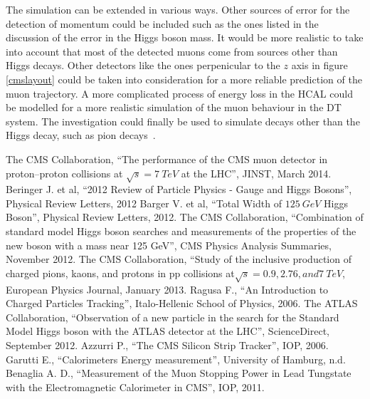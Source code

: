 \documentclass{article}
\begin{document}
The simulation can be extended in various ways. Other sources of error for the detection of momentum could be included such as the ones listed in the discussion of the error in the Higgs boson mass. It would be more realistic to take into account that most of the detected muons come from sources other than Higgs decays. Other detectors like the ones perpenicular to the $z$ axis in figure \ref{cmslayout} could be taken into consideration for a more reliable prediction of the muon trajectory. A more complicated process of energy loss in the HCAL could be modelled for a more realistic simulation of the muon behaviour in the DT system. The investigation could finally be used to simulate decays other than the Higgs decay, such as pion decays~\cite{otherdecay}.

\begin{thebibliography}{1}

 The CMS Collaboration, ``The performance of the CMS muon detector in proton–proton collisions at $\sqrt{s} = 7\ TeV$ at the LHC'', JINST, March 2014.
 Beringer J. et al, ``2012 Review of Particle Physics - Gauge and Higgs Bosons'', Physical Review Letters, 2012
 Barger V. et al, ``Total Width of $125\ GeV$ Higgs Boson'', Physical Review Letters, 2012.
 The CMS Collaboration, ``Combination of standard model Higgs boson searches and measurements of the properties of the new boson with a mass near 125 GeV'', CMS Physics Analysis Summaries, November 2012.
 The CMS Collaboration, ``Study of the inclusive production of charged pions, kaons, and protons in pp collisions at$\sqrt{s} = 0.9, 2.76, and 7\ TeV$, European Physics Journal, January 2013.
 Ragusa F., ``An Introduction to Charged Particles Tracking'', Italo-Hellenic School of Physics, 2006.
 The ATLAS Collaboration, ``Observation of a new particle in the search for the Standard Model Higgs boson with the ATLAS detector at the LHC'', ScienceDirect, September 2012.
 Azzurri P., ``The CMS Silicon Strip Tracker'', IOP, 2006. 
 Garutti E., ``Calorimeters Energy measurement'', University of Hamburg, n.d.
 Benaglia A. D., ``Measurement of the Muon Stopping Power in Lead Tungstate with the Electromagnetic Calorimeter in CMS'', IOP, 2011.

\end{thebibliography}
\end{document}
